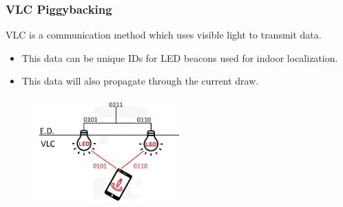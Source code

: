 \documentclass{beamer}
\begin{document}


	\begin{frame}\frametitle{VLC Piggybacking}

		VLC is a communication method which uses visible light to transmit data.

		\begin{itemize}

			\item This data can be unique IDs for LED beacons used for indoor localization.

			\item This data will also propagate through the current draw.


		\end{itemize}


		\begin{figure}
			\centering
			\includegraphics[width=0.5\textwidth]{vlc-indoor-positioning-edit2.jpg}
		\end{figure}



	\end{frame}
\end{document}
